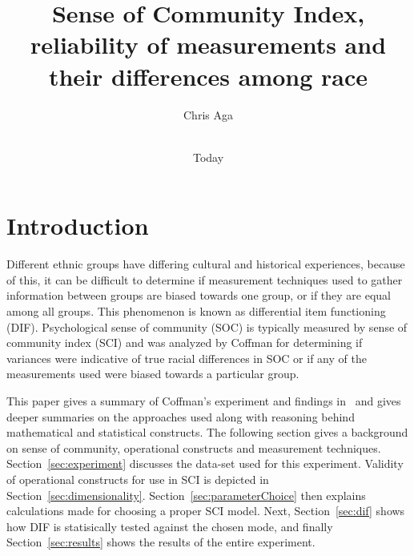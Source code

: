 \documentclass{sig-alternate}
\begin{document}
\title{Sense of Community Index, reliability of measurements and their differences among race}
\author{
\alignauthor
Chris Aga \\
 \\
}

\date{Today}

\maketitle




\section{Introduction}
Different ethnic groups have differing cultural and historical experiences, because of this, it can be difficult to determine if measurement techniques used to gather information between groups are biased towards one group, or if they are equal among all groups. This phenomenon is known as differential item functioning (DIF). Psychological sense of community (SOC) is typically measured by sense of community index (SCI) and was analyzed by Coffman for determining if variances were indicative of true racial differences in SOC or if any of the measurements used were biased towards a particular group.

This paper gives a summary of Coffman's experiment and findings in~\cite{disparities:2009} and gives deeper summaries on the approaches used along with reasoning behind mathematical and statistical constructs. The following section gives a background on sense of community, operational constructs and measurement techniques. Section~\ref{sec:experiment} discusses the data-set used for this experiment. Validity of operational constructs for use in SCI is depicted in Section~\ref{sec:dimensionality}. Section~\ref{sec:parameterChoice} then explains calculations made for choosing a proper SCI model. Next, Section~\ref{sec:dif} shows how DIF is statisically tested against the chosen mode, and finally Section~\ref{sec:results} shows the results of the entire experiment.
\end{document}
